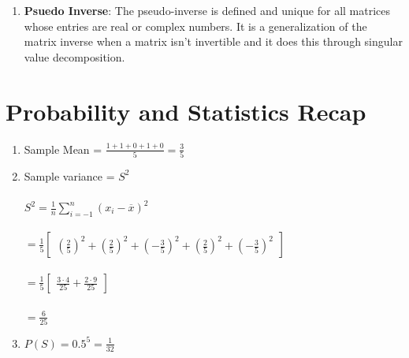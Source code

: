 \documentclass[12pt,letterpaper]{article}
\begin{document}
\begin{enumerate}
            \item
            \textbf{Psuedo Inverse}: The pseudo-inverse is defined and unique for all matrices whose entries are real or complex numbers. It is a generalization of the matrix inverse when a matrix isn't invertible and it does this through singular value decomposition.
            
    \end{enumerate}

\section*{Probability and Statistics Recap}
    \begin{enumerate}
            \item 
            Sample Mean = $ \frac{1+1+0+1+0}{5} =  \frac{3}{5} $
            \item
            Sample variance = $S^2$ \\ \\
            $S^2 =  \frac{1}{n}  \sum_{i=-1}^{n} (x_{i} -  \overline{x})^2$  \\ \\
            $= \frac{1}{5} \begin{bmatrix}(\frac{2}{5})^2 + (\frac{2}{5})^2 + (-\frac{3}{5})^2 + (\frac{2}{5})^2 + (-\frac{3}{5})^2\end{bmatrix}$  \\ \\
            $= \frac{1}{5}  \begin{bmatrix} \frac{3\cdot4}{25} +  \frac{2\cdot9}{25} \end{bmatrix}$  \\ \\
            $=  \frac{6}{25}$
            \item
            $P(S) = 0.5^5 =  \frac{1}{32}$ 
    \end{enumerate}

\end{document}
